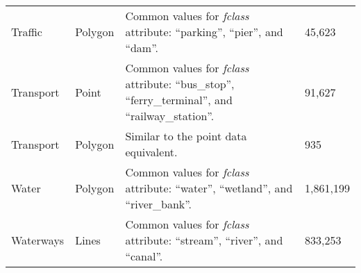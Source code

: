 \begin{longtable}{p{3cm}p{2cm}p{5.7cm}p{2.5cm}}
    Traffic            & Polygon       & Common values for \emph{fclass} attribute: \enquote{parking}, \enquote{pier}, and \enquote{dam}. & 45,623 \\
    Transport          & Point         & Common values for \emph{fclass} attribute: \enquote{bus\_stop}, \enquote{ferry\_terminal}, and \enquote{railway\_station}. & 91,627 \\
    Transport          & Polygon       & Similar to the point data equivalent. & 935 \\
    Water              & Polygon       & Common values for \emph{fclass} attribute: \enquote{water}, \enquote{wetland}, and \enquote{river\_bank}. & 1,861,199 \\
    Waterways          & Lines         & Common values for \emph{fclass} attribute: \enquote{stream}, \enquote{river}, and \enquote{canal}. & 833,253 \\
\end{longtable}
